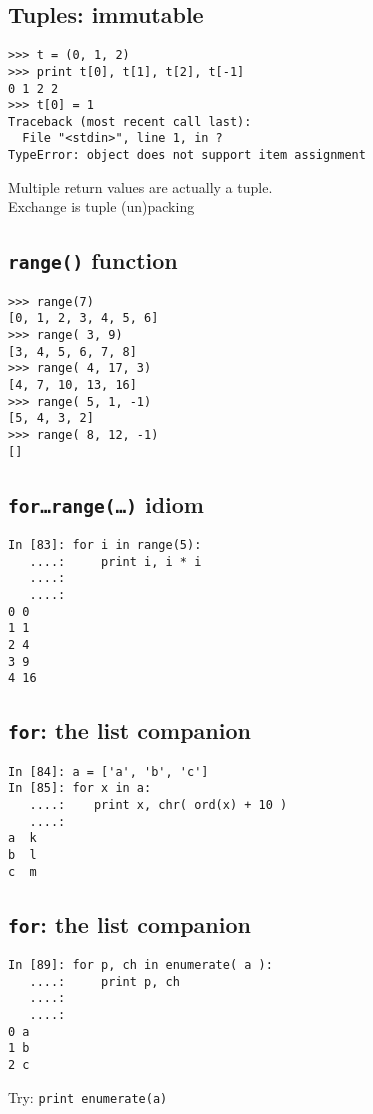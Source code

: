 \documentclass[12pt]{article}
\begin{document}
  \subsection{Tuples: immutable}
\begin{verbatim}
>>> t = (0, 1, 2)
>>> print t[0], t[1], t[2], t[-1] 
0 1 2 2
>>> t[0] = 1
Traceback (most recent call last):
  File "<stdin>", line 1, in ?
TypeError: object does not support item assignment
\end{verbatim}  
    Multiple return values are actually a tuple.\\
    Exchange is tuple (un)packing
  \subsection{\texttt{range()} function}
  \begin{verbatim}
>>> range(7)
[0, 1, 2, 3, 4, 5, 6]
>>> range( 3, 9)
[3, 4, 5, 6, 7, 8]
>>> range( 4, 17, 3)
[4, 7, 10, 13, 16]
>>> range( 5, 1, -1)
[5, 4, 3, 2]
>>> range( 8, 12, -1)
[]
  \end{verbatim}

  \subsection{\texttt{for\ldots range(\ldots)} idiom}
  \begin{verbatim}
In [83]: for i in range(5):
   ....:     print i, i * i
   ....:     
   ....:     
0 0
1 1
2 4
3 9
4 16
\end{verbatim}

  \subsection{\texttt{for}: the list companion}
  
  \begin{verbatim}
In [84]: a = ['a', 'b', 'c']
In [85]: for x in a:
   ....:    print x, chr( ord(x) + 10 )
   ....:
a  k
b  l
c  m
  \end{verbatim}

  \subsection{\texttt{for}: the list companion}
  \begin{verbatim}
In [89]: for p, ch in enumerate( a ):
   ....:     print p, ch
   ....:     
   ....:     
0 a
1 b
2 c
  \end{verbatim}
Try: \texttt{print enumerate(a)}
\end{document}
